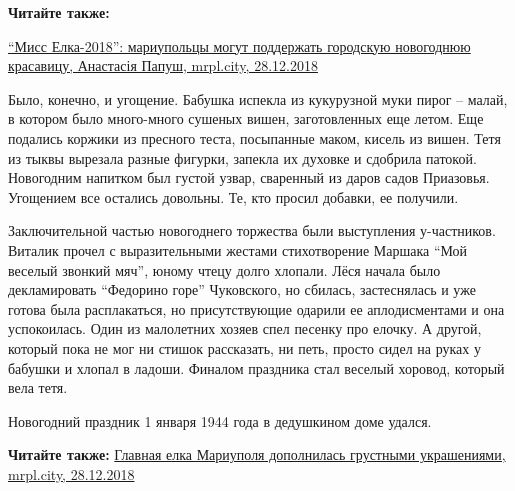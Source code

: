 \textbf{Читайте также:} 

\href{https://mrpl.city/news/view/miss-elka-2018-mariupoltsy-mogut-podderzhat-gorodskuyu-novogodnyuyu-krasavitsu}{%
\enquote{Мисс Елка-2018}: мариупольцы могут поддержать городскую новогоднюю красавицу, Анастасія Папуш, mrpl.city, 28.12.2018}

Было, конечно, и угощение. Бабушка испекла из кукурузной муки пирог – малай, в
котором было много-много сушеных вишен, заготовленных еще летом. Еще подались
коржики из пресного теста, посыпанные маком, кисель из вишен. Тетя из тыквы
вырезала разные фигурки, запекла их духовке и сдобрила патокой. Новогодним
напитком был густой узвар, сваренный из даров садов Приазовья. Угощением все
остались довольны. Те, кто просил добавки, ее получили.

Заключительной частью новогоднего торжества были выступления у\hyp{}частников.
Виталик прочел с выразительными жестами стихотворение Маршака \enquote{Мой веселый
звонкий мяч}, юному чтецу долго хлопали. Лёся начала было декламировать
\enquote{Федорино горе} Чуковского, но сбилась, застеснялась и уже готова была
расплакаться, но присутствующие одарили ее аплодисментами и она успокоилась.
Один из малолетних хозяев спел песенку про елочку. А другой, который пока не
мог ни стишок рассказать, ни петь, просто сидел на руках у бабушки и хлопал в
ладоши. Финалом праздника стал веселый хоровод, который вела тетя.

Новогодний праздник 1 января 1944 года в дедушкином доме удался.

\vspace{0.5cm}
\begin{minipage}{0.9\textwidth}
\textbf{Читайте также:} 
\href{https://mrpl.city/news/view/glavnaya-elka-mariupolya-dopolnilas-grustnymi-ukrasheniyami-foto}{%
Главная елка Мариуполя дополнилась грустными украшениями, mrpl.city, 28.12.2018}
\end{minipage}
\vspace{0.5cm}
